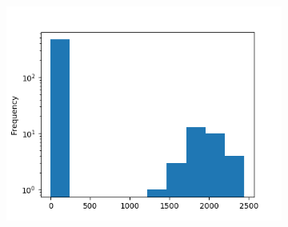 \begin{figure}[!ht]
    \vspace{5mm}

    \begin{subfigure}[!ht]{.5\linewidth}
        \centering
        \includegraphics[width=\textwidth]{./img/interest-earned-targets.png}
    \end{subfigure}
\end{figure}


